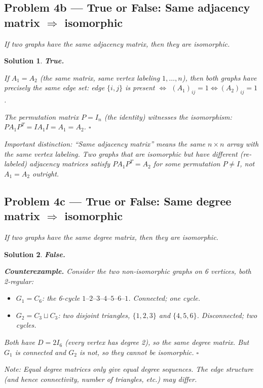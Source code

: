 \documentclass[11pt,a4paper]{article}
\theoremstyle{sol}
\newtheorem*{solution}{Solution}
\begin{document}
\clearpage
\subsection*{Problem 4b --- True or False: Same adjacency matrix $\Rightarrow$ isomorphic}

\textit{If two graphs have the same adjacency matrix, then they are isomorphic.}

\begin{solution}
\textbf{True.}

If $A_1 = A_2$ (the \emph{same} matrix, same vertex labeling $1,\ldots,n$), then both graphs have precisely the same edge set: edge $\{i,j\}$ is present $\iff$ $(A_1)_{ij}=1\iff(A_2)_{ij}=1$.

The permutation matrix $P = I_n$ (the identity) witnesses the isomorphism: $P A_1 P^T = I A_1 I = A_1 = A_2$. $\square$

\textit{Important distinction:} ``Same adjacency matrix'' means the same $n\times n$ array with the same vertex labeling. Two graphs that are isomorphic but have \emph{different} (re-labeled) adjacency matrices satisfy $PA_1P^T=A_2$ for some permutation $P\neq I$, not $A_1=A_2$ outright.
\end{solution}

\subsection*{Problem 4c --- True or False: Same degree matrix $\Rightarrow$ isomorphic}

\textit{If two graphs have the same degree matrix, then they are isomorphic.}

\begin{solution}
\textbf{False.}

\textbf{Counterexample.} Consider the two non-isomorphic graphs on 6 vertices, both 2-regular:
\begin{itemize}
  \item $G_1 = C_6$: the 6-cycle $1\text{--}2\text{--}3\text{--}4\text{--}5\text{--}6\text{--}1$. Connected; one cycle.
  \item $G_2 = C_3 \sqcup C_3$: two disjoint triangles, $\{1,2,3\}$ and $\{4,5,6\}$. Disconnected; two cycles.
\end{itemize}
Both have $D = 2I_6$ (every vertex has degree 2), so the \emph{same} degree matrix. But $G_1$ is connected and $G_2$ is not, so they cannot be isomorphic. $\square$

\textit{Note:} Equal degree matrices only give equal degree sequences. The edge structure (and hence connectivity, number of triangles, etc.) may differ.
\end{solution}
\end{document}
